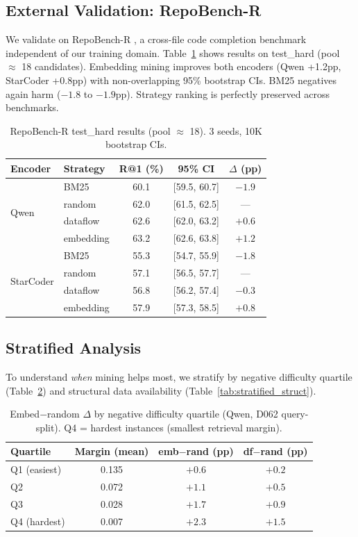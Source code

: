 \documentclass[11pt,a4paper]{article}
\begin{document}
\subsection{External Validation: RepoBench-R}
\label{sec:repobench}

We validate on RepoBench-R \cite{repobench}, a cross-file code completion benchmark independent of our training domain. Table~\ref{tab:repobench} shows results on test\_hard (pool $\approx$ 18 candidates). Embedding mining improves both encoders (Qwen +1.2pp, StarCoder +0.8pp) with non-overlapping 95\% bootstrap CIs. BM25 negatives again harm ($-1.8$ to $-1.9$pp). Strategy ranking is perfectly preserved across benchmarks.

\begin{table}[t]
\centering
\small
\caption{RepoBench-R test\_hard results (pool $\approx$ 18). 3 seeds, 10K bootstrap CIs.}
\label{tab:repobench}
\begin{tabular}{llccc}
\toprule
Encoder & Strategy & R@1 (\%) & 95\% CI & $\Delta$ (pp) \\
\midrule
\multirow{4}{*}{Qwen} & BM25 & 60.1 & [59.5, 60.7] & $-1.9$ \\
& random & 62.0 & [61.5, 62.5] & --- \\
& dataflow & 62.6 & [62.0, 63.2] & $+0.6$ \\
& embedding & 63.2 & [62.6, 63.8] & $+1.2$ \\
\midrule
\multirow{4}{*}{StarCoder} & BM25 & 55.3 & [54.7, 55.9] & $-1.8$ \\
& random & 57.1 & [56.5, 57.7] & --- \\
& dataflow & 56.8 & [56.2, 57.4] & $-0.3$ \\
& embedding & 57.9 & [57.3, 58.5] & $+0.8$ \\
\bottomrule
\end{tabular}
\end{table}

\subsection{Stratified Analysis}
\label{sec:stratified}

To understand \emph{when} mining helps most, we stratify by negative difficulty quartile (Table~\ref{tab:stratified_neg}) and structural data availability (Table~\ref{tab:stratified_struct}).

\begin{table}[t]
\centering
\small
\caption{Embed$-$random $\Delta$ by negative difficulty quartile (Qwen, D062 query-split). Q4 = hardest instances (smallest retrieval margin).}
\label{tab:stratified_neg}
\begin{tabular}{lccc}
\toprule
Quartile & Margin (mean) & emb$-$rand (pp) & df$-$rand (pp) \\
\midrule
Q1 (easiest) & 0.135 & $+0.6$ & $+0.2$ \\
Q2 & 0.072 & $+1.1$ & $+0.5$ \\
Q3 & 0.028 & $+1.7$ & $+0.9$ \\
Q4 (hardest) & 0.007 & $+2.3$ & $+1.5$ \\
\bottomrule
\end{tabular}
\end{table}
\end{document}

